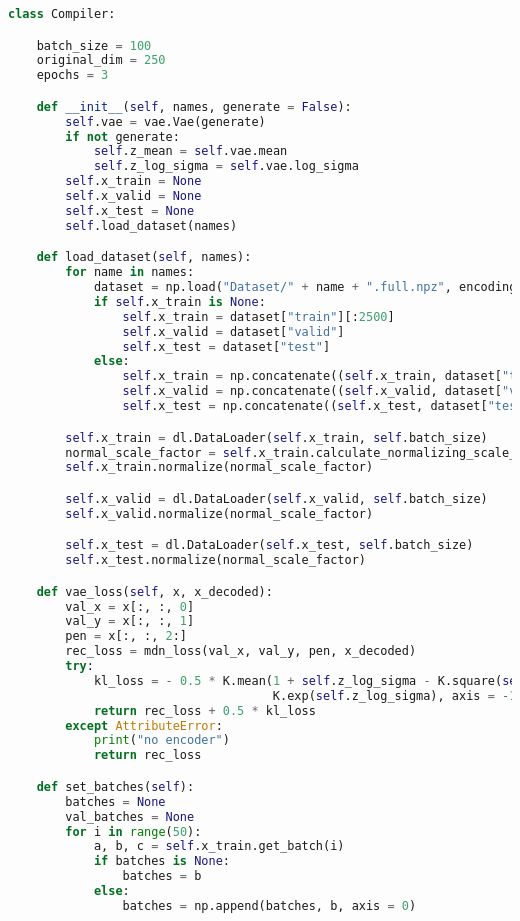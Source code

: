 \begin{lstlisting}[language = Python, frame = single, caption = {La classe che si occupa della compilazione della rete e del fitting dei dati}, captionpos = b]
	class Compiler:

    batch_size = 100
    original_dim = 250
    epochs = 3

    def __init__(self, names, generate = False):
        self.vae = vae.Vae(generate)
        if not generate:
            self.z_mean = self.vae.mean
            self.z_log_sigma = self.vae.log_sigma
        self.x_train = None
        self.x_valid = None
        self.x_test = None
        self.load_dataset(names)

    def load_dataset(self, names):
        for name in names:
            dataset = np.load("Dataset/" + name + ".full.npz", encoding = 'bytes')
            if self.x_train is None:
                self.x_train = dataset["train"][:2500]
                self.x_valid = dataset["valid"]
                self.x_test = dataset["test"]
            else:
                self.x_train = np.concatenate((self.x_train, dataset["train"][:2500]))
                self.x_valid = np.concatenate((self.x_valid, dataset["valid"]))
                self.x_test = np.concatenate((self.x_test, dataset["test"]))

        self.x_train = dl.DataLoader(self.x_train, self.batch_size)
        normal_scale_factor = self.x_train.calculate_normalizing_scale_factor()
        self.x_train.normalize(normal_scale_factor)

        self.x_valid = dl.DataLoader(self.x_valid, self.batch_size)
        self.x_valid.normalize(normal_scale_factor)

        self.x_test = dl.DataLoader(self.x_test, self.batch_size)
        self.x_test.normalize(normal_scale_factor)

    def vae_loss(self, x, x_decoded):
        val_x = x[:, :, 0]
        val_y = x[:, :, 1]
        pen = x[:, :, 2:]
        rec_loss = mdn_loss(val_x, val_y, pen, x_decoded)
        try:
            kl_loss = - 0.5 * K.mean(1 + self.z_log_sigma - K.square(self.z_mean) -
                                     K.exp(self.z_log_sigma), axis = -1)
            return rec_loss + 0.5 * kl_loss
        except AttributeError:
            print("no encoder")
            return rec_loss

    def set_batches(self):
        batches = None
        val_batches = None
        for i in range(50):
            a, b, c = self.x_train.get_batch(i)
            if batches is None:
                batches = b
            else:
                batches = np.append(batches, b, axis = 0)


\end{lstlisting}
